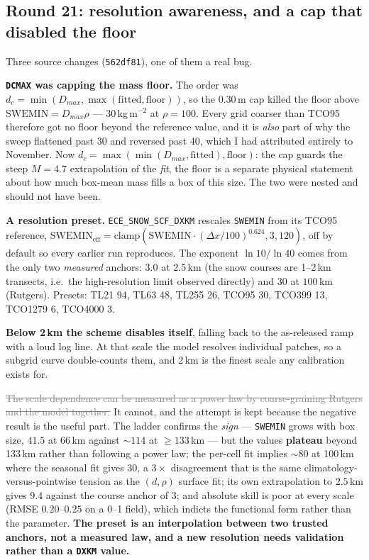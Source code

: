 \documentclass[10pt]{article}
\newcommand{\dead}[1]{\textcolor{gray}{\sout{#1}}}
\begin{document}
\subsection{Round 21: resolution awareness, and a cap that disabled the
floor}\label{sub:r21}
Three source changes (\texttt{562df81}), one of them a real bug.

\textbf{\texttt{DCMAX} was capping the mass floor.} The order was
$d_c=\min(D_{max},\max(\text{fitted},\text{floor}))$, so the $0.30$\,m cap killed the floor
above $\mathrm{SWEMIN}=D_{max}\rho$ --- 30\,kg\,m$^{-2}$ at $\rho=100$. Every grid coarser
than TCO95 therefore got no floor beyond the reference value, and it is \emph{also} part of
why the sweep flattened past 30 and reversed past 40, which I had attributed entirely to
November. Now $d_c=\max(\min(D_{max},\text{fitted}),\text{floor})$: the cap guards the steep
$M=4.7$ extrapolation of the \emph{fit}, the floor is a separate physical statement about
how much box-mean mass fills a box of this size. The two were nested and should not have been.

\textbf{A resolution preset.} \texttt{ECE\_SNOW\_SCF\_DXKM} rescales \texttt{SWEMIN} from
its TCO95 reference, $\mathrm{SWEMIN}_{\text{eff}}=\mathrm{clamp}(\mathrm{SWEMIN}\cdot
(\Delta x/100)^{0.624},3,120)$, off by default so every earlier run reproduces. The exponent
$\ln 10/\ln 40$ comes from the only two \emph{measured} anchors: $3.0$ at $2.5$\,km (the
snow courses are 1--2\,km transects, i.e.\ the high-resolution limit observed directly) and
$30$ at $100$\,km (Rutgers). Presets: TL21 94, TL63 48, TL255 26, TCO95 30, TCO399 13,
TCO1279 6, TCO4000 3.

\textbf{Below 2\,km the scheme disables itself}, falling back to the as-released ramp with a
loud log line. At that scale the model resolves individual patches, so a subgrid curve
double-counts them, and 2\,km is the finest scale any calibration exists for.

\dead{The scale dependence can be measured as a power law by coarse-graining Rutgers and
the model together.} It cannot, and the attempt is kept because the negative result is the
useful part. The ladder confirms the \emph{sign} --- \texttt{SWEMIN} grows with box size,
$41.5$ at 66\,km against ${\sim}114$ at $\ge133$\,km --- but the values \textbf{plateau}
beyond 133\,km rather than following a power law; the per-cell fit implies ${\sim}80$ at
100\,km where the seasonal fit gives 30, a $3\times$ disagreement that is the same
climatology-versus-pointwise tension as the $(d,\rho)$ surface fit; its own extrapolation to
$2.5$\,km gives $9.4$ against the course anchor of $3$; and absolute skill is poor at every
scale (RMSE $0.20$--$0.25$ on a 0--1 field), which indicts the functional form rather than
the parameter. \textbf{The preset is an interpolation between two trusted anchors, not a
measured law, and a new resolution needs validation rather than a \texttt{DXKM} value.}
\end{document}
